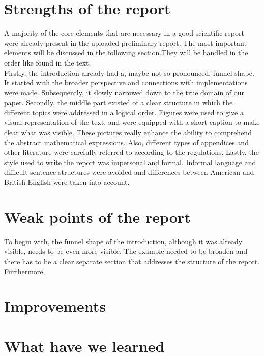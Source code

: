\documentclass{article}
\begin{document}

\section{Strengths of the report}
A majority of the core elements that are necessary in a good scientific report were already present in the uploaded preliminary report. The most important elements will be discussed in the following section.They will be handled in the order like found in the text.\\
Firstly, the introduction already had a, maybe not so pronounced, funnel shape. It started with the broader perspective and connections with implementations were made. Subsequently, it slowly narrowed down to the true domain of our paper.
Secondly, the middle part existed of a clear structure in which the different topics were addressed in a logical order. Figures were used to give a visual representation of the text, and were equipped with a short caption to make clear what was visible. These pictures really enhance the ability to comprehend the abstract mathematical expressions. Also, different types of appendices and other literature were carefully referred to according to the regulations.
Lastly, the style used to write the report was impersonal and formal. Informal language and difficult sentence structures were avoided and differences between American and British English were taken into account. 

\section{Weak points of the report}

To begin with, the funnel shape of the introduction, although it was already visible, needs to be even more visible. The example needed to be broaden and there has to be a clear separate section that addresses the structure of the report.
\\
Furthermore, 

\section{Improvements}

\section{What have we learned}
\end{document}
